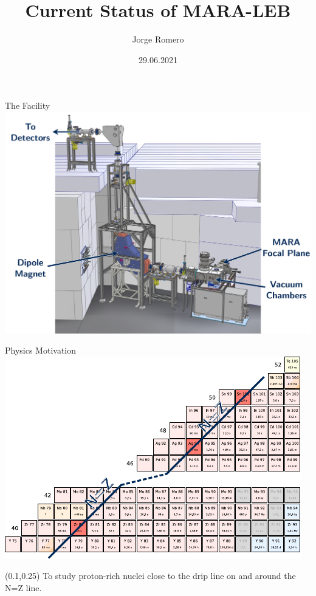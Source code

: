 \documentclass{beamer}
\title{Current Status of MARA-LEB}
\date{29.06.2021}
\author[auth]{Jorge Romero}
\begin{document}
\begin{frame}
\titlepage
\end{frame}
\begin{frame}{The Facility}
    \vspace*{3em}
    \centering
    \includegraphics[scale=0.2]{MARA-LEB2.pdf}
\end{frame}
\begin{frame}{Physics Motivation}
    \vspace*{0em}
    \centering
    \includegraphics[scale=1.3]{nuclides.pdf}
    \begin{textblock*}{0.5\textwidth}(0.1\textwidth,0.25\textheight)
        \flushleft
        To study proton-rich nuclei close to the drip line on and around the N=Z line.
    \end{textblock*}
\end{frame}
\end{document}
